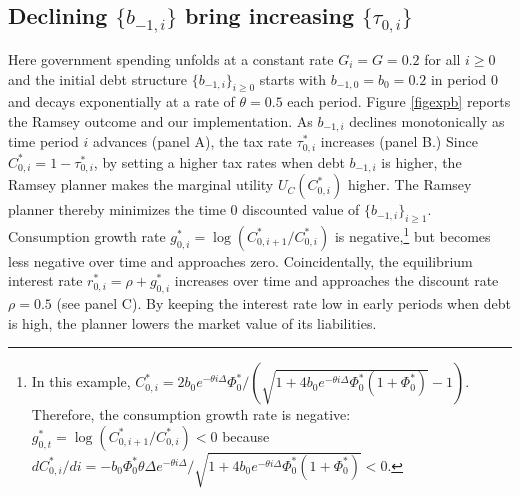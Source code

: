 \documentclass[12pt]{article}
\begin{document}
\subsection{Declining $\{b_{-1, i}\}$ bring increasing $\{\tau_{0,i}\}$ }\label{subsecdecliningb} 
Here government spending unfolds at a constant rate $G_i=G=0.2$ for all $i\geq 0$ and the initial   debt structure $\{b_{-1, i} \}_{i\geq 0}$  starts with $b_{-1, 0} = b_0=0.2$ in period 0 and decays exponentially at a rate of $\theta=0.5$ each period. 
Figure \ref{figexpb} reports the Ramsey  outcome  and our implementation. %
As   $b_{-1, i} $ declines monotonically  as time period $i$ advances (panel A), the tax rate $\tau_{0, i}^\ast$  increases  (panel B.) %
 Since $C _{0,i}^\ast=1-\tau_{0,i}^\ast$, by setting a higher tax rates  when debt $b_{-1, i}$ is higher, the Ramsey planner makes the marginal utility $U_C(C _{0,i}^\ast)$ higher. The Ramsey planner thereby minimizes the time 0 discounted value of $\{b_{-1, i} \}_{i\geq 1}$. 
Consumption growth rate $g_{0,i}^\ast= \log({C}_{0,i+1}^\ast/{C}_{0,i}^\ast) $ is   negative,\footnote{In this example, $C_{0, i}^* = 2 b_0e^{-\theta i\Delta}\Phi_0^*/ (\sqrt{1+4b_0e^{-\theta i\Delta}\Phi_0^*(1+\Phi_0^*)}-1)$. Therefore, the consumption growth rate  is negative: $g^*_{0, t} = \log({C}_{0,i+1}^\ast/{C}_{0,i}^\ast)<0$   because $d C_{0, i}^* /di = -b_0\Phi_0^*\theta\Delta e^{-\theta i \Delta}/\sqrt{1+4b_0e^{-\theta i\Delta}\Phi_0^*(1+\Phi_0^*)}<0$. } %
but becomes less negative over time and  approaches zero. 
Coincidentally, the  equilibrium interest rate $r_{0,i}^\ast = \rho + g_{0,i}^\ast$   increases over  time and   approaches the discount rate  $\rho=0.5$  (see panel C). 
By keeping the interest rate low in early periods when debt is high, the planner lowers the market value of its liabilities. %
% 
\end{document}
